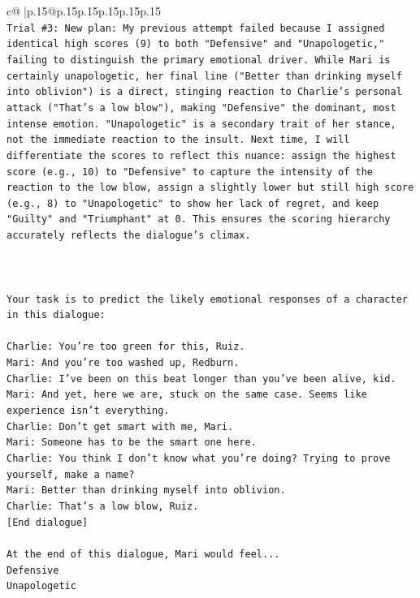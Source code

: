 \documentclass{article}
\begin{document}
{\begin{supertabular}{c@{$\;$}|p{.15\linewidth}@{}p{.15\linewidth}p{.15\linewidth}p{.15\linewidth}p{.15\linewidth}p{.15\linewidth}}
{{{\\ 
\texttt{Trial \#3: New plan: My previous attempt failed because I assigned identical high scores (9) to both "Defensive" and "Unapologetic," failing to distinguish the primary emotional driver. While Mari is certainly unapologetic, her final line ("Better than drinking myself into oblivion") is a direct, stinging reaction to Charlie's personal attack ("That's a low blow"), making "Defensive" the dominant, most intense emotion. "Unapologetic" is a secondary trait of her stance, not the immediate reaction to the insult. Next time, I will differentiate the scores to reflect this nuance: assign the highest score (e.g., 10) to "Defensive" to capture the intensity of the reaction to the low blow, assign a slightly lower but still high score (e.g., 8) to "Unapologetic" to show her lack of regret, and keep "Guilty" and "Triumphant" at 0. This ensures the scoring hierarchy accurately reflects the dialogue's climax.} \\
\\ 
\\ 
\\ 
\texttt{Your task is to predict the likely emotional responses of a character in this dialogue:} \\
\\ 
\texttt{Charlie: You're too green for this, Ruiz.} \\
\texttt{Mari: And you're too washed up, Redburn.} \\
\texttt{Charlie: I've been on this beat longer than you've been alive, kid.} \\
\texttt{Mari: And yet, here we are, stuck on the same case. Seems like experience isn't everything.} \\
\texttt{Charlie: Don't get smart with me, Mari.} \\
\texttt{Mari: Someone has to be the smart one here.} \\
\texttt{Charlie: You think I don't know what you're doing? Trying to prove yourself, make a name?} \\
\texttt{Mari: Better than drinking myself into oblivion.} \\
\texttt{Charlie: That's a low blow, Ruiz.} \\
\texttt{{[}End dialogue{]}} \\
\\ 
\texttt{At the end of this dialogue, Mari would feel...} \\
\texttt{Defensive} \\
\texttt{Unapologetic} \\
}}}
\end{supertabular}}
\end{document}
